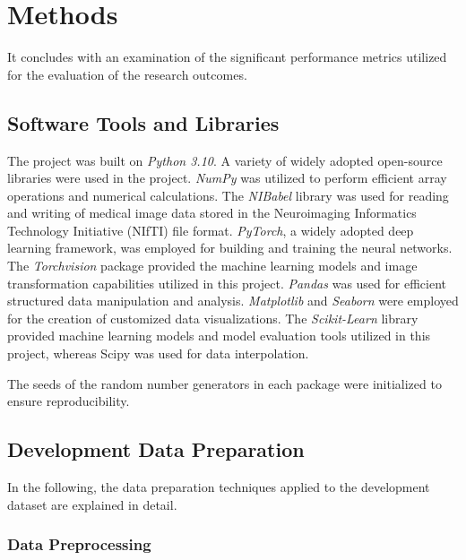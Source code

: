 \section{Methods}
\label{sec:methods}


It concludes with an examination of the significant performance metrics utilized for the evaluation of 
the research outcomes.

\subsection{Software Tools and Libraries}
\label{subsec:libs}


The project was built on \textit{Python 3.10}.
A variety of widely adopted open-source libraries were used in the project.
\textit{NumPy} was utilized to perform efficient array operations and numerical calculations.
The \textit{NIBabel} library was used for reading and writing of medical image data stored in the
Neuroimaging Informatics Technology Initiative (NIfTI) file format.
\textit{PyTorch}, a widely adopted deep learning framework, was employed for building 
and training the neural networks.
The \textit{Torchvision} package provided the machine learning models and image transformation capabilities 
utilized in this project.
\textit{Pandas} was used for efficient structured data manipulation and analysis.
\textit{Matplotlib} and \textit{Seaborn} were employed for the creation of customized data visualizations.
The \textit{Scikit-Learn} library provided machine learning models and model evaluation tools utilized in this project, 
whereas Scipy was used for data interpolation.

The seeds of the random number generators in each package were initialized to ensure reproducibility.

\subsection{Development Data Preparation}

In the following, the data preparation techniques applied to the development dataset are explained in detail.

\subsubsection{Data Preprocessing}
\label{subsubsec:img_preprocess_dev}

